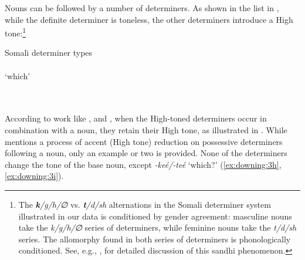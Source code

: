 \documentclass[output=paper]{langscibook}
\begin{document}
Nouns can be followed by a number of determiners. As shown in the list in , while the definite determiner is toneless, the other determiners introduce a High tone:\footnote{The \textit{\textbf{k}/g/h/∅} vs. \textit{\textbf{t}/d/sh} alternations in the Somali determiner system illustrated in our data is conditioned by gender agreement: masculine nouns take the \textit{k/g/h/∅} series of determiners, while feminine nouns take the \textit{t/d/sh} series. The allomorphy found in both series of determiners is phonologically conditioned. See, e.g., \citet{Saeed1993,Saeed1999}, for detailed discussion of this sandhi phenomenon.}


\noindent\parbox{\textwidth}{\ea  Somali determiner types \citep[111--117]{Saeed1999} \label{ex:downing:2}
  \\
  \\
   `which'\\
  \\
  \\
  \z
\z}

According to work like \citet{Green2016,Hyman1981}, and \citet{Saeed1993,Saeed1999}, when the High-toned determiners occur in combination with a noun, they retain their High tone, as illustrated in . While \citet[191]{Hyman1981} mentions a process of accent (High tone) reduction on possessive determiners following a noun, only an example or two is provided. None of the determiners change the tone of the base noun, except \textit{{}-keé/-teé} ‘which?’ (\ref{ex:downing:3h}, \ref{ex:downing:3i}).
\end{document}
